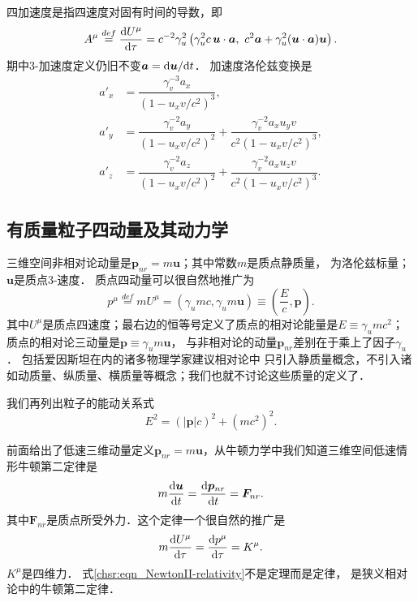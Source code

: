 四加速度是指四速度对固有时间的导数，即
\begin{equation}\label{chsr:eqn_4A}
	A^\mu \overset{def}{=} \dfrac{{\rm d} U^\mu}{{\rm d} \tau}
	= c^{-2}\gamma_{u}^2  \left( \gamma_{u}^2 c \,\boldsymbol{u}\cdot \boldsymbol{a}, \
	c^2\boldsymbol{a} + \gamma_{u}^2 (\boldsymbol{u}\cdot \boldsymbol{a}) \boldsymbol{u}\right)  .
\end{equation}
期中3-加速度定义仍旧不变$\boldsymbol{a}={\rm d}\boldsymbol{u}/{{\rm d}t}$．
加速度洛伦兹变换是
\begin{equation}\label{chsr:eqn_3Atrans}
	\begin{aligned}
		a'_x &= \dfrac{\gamma^{-3}_v a_x}{(1-u_x v/c^2)^3}, \\
		a'_y &= \dfrac{\gamma^{-2}_v a_y}{(1-u_x v/c^2)^2}+\dfrac{\gamma^{-2}_v a_x u_y v}{c^2(1-u_x v/c^2)^3}, \\
		a'_z &= \dfrac{\gamma^{-2}_v a_z}{(1-u_x v/c^2)^2}+\dfrac{\gamma^{-2}_v a_x u_z v}{c^2(1-u_x v/c^2)^3}.
	\end{aligned}
\end{equation}




\subsection{有质量粒子四动量及其动力学}
三维空间{\kaishu 非}相对论动量是$\boldsymbol{p}_{nr} = m \boldsymbol{u}$；其中{\kaishu 常数}$m$是质点静质量，
为洛伦兹标量；$\boldsymbol{u}$是质点3-速度．
质点{\heiti 四动量}可以很自然地推广为
\begin{equation}\label{chsr:eqn_4momentum}
	p^\mu \overset{def}{=}  m U^\mu = (\gamma_u mc,\gamma_u m\boldsymbol{u})
	\equiv \left(\dfrac{E}{c},\boldsymbol{p}\right).
\end{equation}
其中$U^\mu$是质点四速度；最右边的恒等号定义了质点的相对论能量是$E\equiv \gamma_u mc^2$；
质点的相对论三动量是$\boldsymbol{p}\equiv\gamma_u m\boldsymbol{u}$，
与非相对论的动量$\boldsymbol{p}_{nr}$差别在于乘上了因子$\gamma_u$．
包括爱因斯坦在内的诸多物理学家建议相对论中
只引入静质量概念，不引入诸如动质量、纵质量、横质量等概念；我们也就不讨论这些质量的定义了．

我们再列出粒子的能动关系式
\begin{equation}\label{chsr:eqn_energyp}
    E^2  = (|\boldsymbol{p}| c)^2 + (m c^2)^2 .
\end{equation}




前面给出了低速三维动量定义$\boldsymbol{p}_{nr} = m \boldsymbol{u}$，从牛顿力学中我们知道三维空间低速情形牛顿第二定律是
\begin{equation}\label{chsr:eqn_NewtonII}
	m\frac{{\rm d}\boldsymbol{u}}{{\rm d}t}  = \frac{{\rm d}\boldsymbol{p}_{nr}}{{\rm d}t} =  \boldsymbol{F}_{nr} .
\end{equation}
其中$\boldsymbol{F}_{nr}$是质点所受外力．这个定律一个很自然的推广是
\begin{equation}\label{chsr:eqn_NewtonII-relativity}
	m\frac{{\rm d}{U^\mu}}{{\rm d}\tau} = \frac{{\rm d}{p^\mu}}{{\rm d}\tau}  =  K^\mu .
\end{equation}
$K^\mu$是四维力．
式\eqref{chsr:eqn_NewtonII-relativity}不是定理而是定律，
是{\kaishu 狭义相对论中的牛顿第二定律}．

